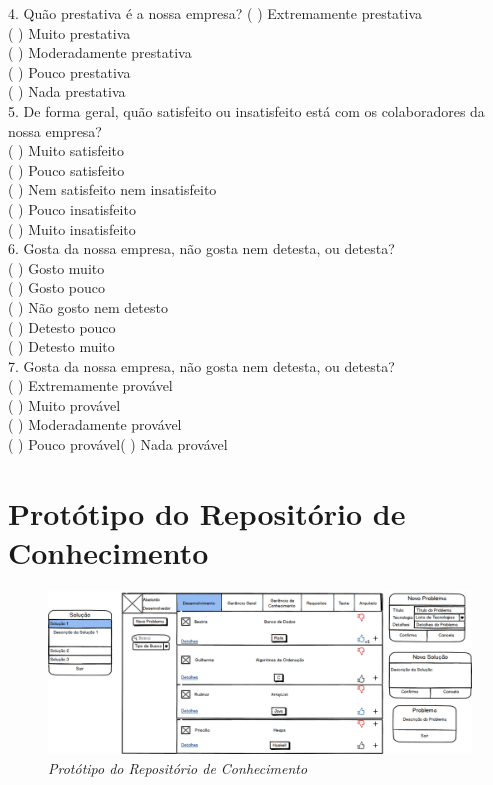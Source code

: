 \begin{apendicesenv}
4. Quão prestativa é a nossa empresa? ( ) Extremamente prestativa \\
( ) Muito prestativa \\
( ) Moderadamente prestativa \\
( ) Pouco prestativa \\
( ) Nada prestativa \\
 
5.  De forma geral, quão satisfeito ou insatisfeito está com os colaboradores da nossa empresa? \\
( ) Muito satisfeito \\
( ) Pouco satisfeito \\
( ) Nem satisfeito nem insatisfeito \\
( ) Pouco insatisfeito \\
( ) Muito insatisfeito \\
 
6. Gosta da nossa empresa, não gosta nem detesta, ou detesta? \\
( ) Gosto muito \\
( ) Gosto pouco \\
( ) Não gosto nem detesto \\
( ) Detesto pouco \\
( ) Detesto muito \\
 
7. Gosta da nossa empresa, não gosta nem detesta, ou detesta? \\
( ) Extremamente provável \\
( ) Muito provável \\
( ) Moderadamente provável \\
( ) Pouco provável( ) Nada provável\\


\chapter{Protótipo do Repositório de Conhecimento}

\begin{figure}[H]
\centering\includegraphics[scale=0.5]{figuras/prototipo.png}
\caption{\textit{Protótipo do Repositório de Conhecimento}}
\end{figure}


\end{apendicesenv}
